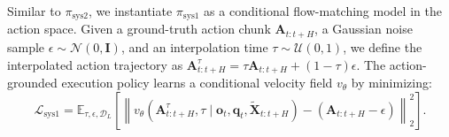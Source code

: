 Similar to $\pi_{\mathrm{sys2}}$, we instantiate $\pi_{\mathrm{sys1}}$ as a conditional flow-matching model in the action space.
Given a ground-truth action chunk $\mathbf{A}_{t:t+H}$, a Gaussian noise sample $\epsilon\sim\mathcal{N}(0,\mathbf{I})$, and an interpolation time $\tau\sim\mathcal{U}(0,1)$, we define the interpolated action trajectory as
$
    \mathbf{A}_{t:t+H}^{\tau}
    =
    \tau \mathbf{A}_{t:t+H} + (1-\tau)\epsilon
$.
The action-grounded execution policy learns a conditional velocity field $v_{\theta}$ by minimizing:
\begin{equation}
    \mathcal{L}_{\mathrm{sys1}}
    =
    \mathbb{E}_{\tau,\epsilon,\mathcal{D}_{L}}
    \left[
    \left\|
    v_{\theta}
    \left(
    \mathbf{A}_{t:t+H}^{\tau}, \tau
    \mid
    \mathbf{o}_t, \mathbf{q}_t, \mathbf{\tilde{X}}_{t:t+H}
    \right)
    -
    \left(
    \mathbf{A}_{t:t+H}-\epsilon
    \right)
    \right\|_2^2
    \right].
    \label{eq:sys1_flow_matching}
\end{equation}
